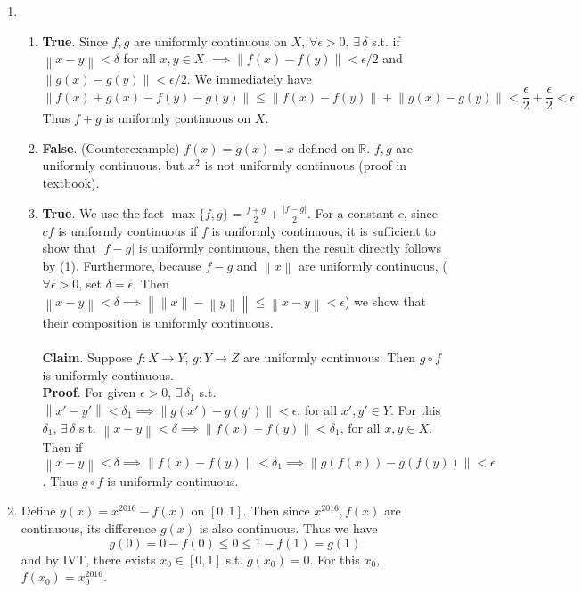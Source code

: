 \documentclass[11pt]{report}
\newcommand{\norm}[1]{\left\lVert#1\right\rVert}
\newcommand{\ra}{\rightarrow}
\newcommand{\abs}[1]{\left|#1\right|}
\newcommand{\imp}{\implies}
\newcommand{\R}{\mathbb{R}}
\begin{document}
\begin{enumerate}
\item 
\begin{enumerate}
	\item \textbf{True}. Since $f, g$ are uniformly continuous on $X$, $\forall \epsilon > 0$, $\exists\,\delta$ s.t. if $\norm{x - y} <\delta$ for all $x, y\in X$ $\imp \norm{f(x)-f(y)} < \epsilon/2$ and $\norm{g(x) - g(y)} < \epsilon/2$. We immediately have
	$$\norm{f(x) + g(x) - f(y) - g(y)} \leq \norm{f(x) - f(y)} + \norm{g(x) - g(y)} < \frac{\epsilon}{2}+ \frac{\epsilon}{2} < \epsilon$$ Thus $f+g$ is uniformly continuous on $X$. 
	\item \textbf{False}. (Counterexample) $f(x) = g(x) = x$ defined on $\R$. $f, g$ are uniformly continuous, but $x^2$ is not uniformly continuous (proof in textbook).
	\item \textbf{True}. We use the fact $\max\{f, g\} = \frac{f+g}{2} + \frac{\abs{f-g}}{2}$. For a constant $c$, since $cf$ is uniformly continuous if $f$ is uniformly continuous, it is sufficient to show that $\abs{f-g}$ is uniformly continuous, then the result directly follows by (1). Furthermore, because $f-g$ and $\norm{x}$ are uniformly continuous, ($\forall \epsilon > 0$, set $\delta = \epsilon$. Then $\norm{x - y} < \delta \imp \norm{\norm{x} - \norm{y}} \leq \norm{x - y} <\epsilon$) we show that their composition is uniformly continuous.\\
	\\
	\textbf{Claim}. Suppose $f:X\ra Y$, $g: Y\ra Z$ are uniformly continuous. Then $g\circ f$ is uniformly continuous.\\
	\textbf{Proof}. For given $\epsilon > 0$, $\exists\,\delta_1$ s.t. $\norm{x' - y'} < \delta_1 \imp \norm{g(x') - g(y')} < \epsilon$, for all $x', y'\in Y$. For this $\delta_1$, $\exists\,\delta$ s.t. $\norm{x-y} < \delta \imp \norm{f(x)-f(y)} < \delta_1$, for all $x, y\in X$. Then if $\norm{x - y} < \delta \imp \norm{f(x) - f(y)} < \delta_1 \imp \norm{g(f(x)) - g(f(y))} < \epsilon$. Thus $g\circ f$ is uniformly continuous.
\end{enumerate}

\item Define $g(x) = x^{2016} - f(x)$ on $[0, 1]$. Then since $x^{2016}, f(x)$ are continuous, its difference $g(x)$ is also continuous. Thus we have $$g(0) = 0 - f(0) \leq 0 \leq 1-f(1) = g(1)$$and by IVT, there exists $x_0\in [0, 1]$ s.t. $g(x_0) = 0$. For this $x_0$, $f(x_0) = x_0^{2016}$.


\end{enumerate}
\end{document}
